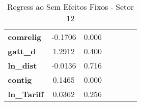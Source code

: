 \begin{table}[ht]
\begin{center}
\begin{tabular}{lcccccc}
\textbf{comrelig}                                                  &      -0.1706  &         0.006   \\
\textbf{gatt\_d}                                                   &       1.2912  &         0.400   \\
\textbf{ln\_dist}                                                  &      -0.0136  &         0.716   \\
\textbf{contig}                                                    &       0.1465  &         0.000   \\
\textbf{ln\_Tariff}                                                &       0.0362  &         0.256   \\
\bottomrule
\end{tabular}
\caption{Regress ao Sem Efeitos Fixos - Setor 12}
\end{center}
\end{table}